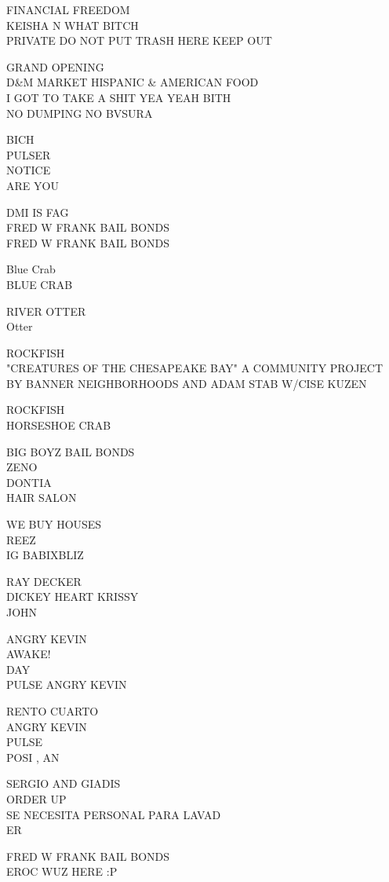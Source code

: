 \documentclass[10pt,letterpaper]{article}
\begin{document}
FINANCIAL FREEDOM\\
KEISHA N WHAT BITCH\\
PRIVATE DO NOT PUT TRASH HERE KEEP OUT

GRAND OPENING\\
D\&M MARKET HISPANIC \& AMERICAN FOOD\\
I GOT TO TAKE A SHIT YEA YEAH BITH\\
NO DUMPING NO BVSURA

BICH\\
PULSER\\
NOTICE\\
ARE YOU

DMI IS FAG\\
FRED W FRANK BAIL BONDS\\
FRED W FRANK BAIL BONDS

Blue Crab\\
BLUE CRAB

RIVER OTTER\\
Otter

ROCKFISH\\
"CREATURES OF THE CHESAPEAKE BAY" A COMMUNITY PROJECT BY BANNER NEIGHBORHOODS AND ADAM STAB W/CISE KUZEN

ROCKFISH\\
HORSESHOE CRAB

BIG BOYZ BAIL BONDS\\
ZENO\\
DONTIA\\
HAIR SALON

WE BUY HOUSES\\
REEZ\\
IG BABIXBLIZ

RAY DECKER\\
DICKEY HEART KRISSY\\
JOHN

ANGRY KEVIN\\
AWAKE!\\
DAY\\
PULSE ANGRY KEVIN

RENTO CUARTO\\
ANGRY KEVIN\\
PULSE\\
POSI , AN

SERGIO AND GIADIS\\
ORDER UP\\
SE NECESITA PERSONAL PARA LAVAD\\
ER

FRED W FRANK BAIL BONDS\\
EROC WUZ HERE :P
\end{document}
